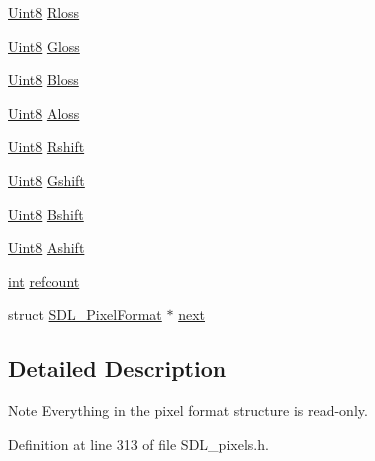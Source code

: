 \begin{DoxyCompactItemize}
\hyperlink{_s_d_l__stdinc_8h_a2944638813a090aa23e62f4da842c3e2}{Uint8} \hyperlink{struct_s_d_l___pixel_format_a9994b4ed87a2551253aebfa191db8424}{Rloss}
\item 
\hyperlink{_s_d_l__stdinc_8h_a2944638813a090aa23e62f4da842c3e2}{Uint8} \hyperlink{struct_s_d_l___pixel_format_a94469768d8436e631a13d68623ff663f}{Gloss}
\item 
\hyperlink{_s_d_l__stdinc_8h_a2944638813a090aa23e62f4da842c3e2}{Uint8} \hyperlink{struct_s_d_l___pixel_format_a337072c1bc8b41efdd2da4e95b8c2ff7}{Bloss}
\item 
\hyperlink{_s_d_l__stdinc_8h_a2944638813a090aa23e62f4da842c3e2}{Uint8} \hyperlink{struct_s_d_l___pixel_format_a660e95097874088292f1289a458efaa2}{Aloss}
\item 
\hyperlink{_s_d_l__stdinc_8h_a2944638813a090aa23e62f4da842c3e2}{Uint8} \hyperlink{struct_s_d_l___pixel_format_abfdec7b9ee2ee39db630f4022e4e0daa}{Rshift}
\item 
\hyperlink{_s_d_l__stdinc_8h_a2944638813a090aa23e62f4da842c3e2}{Uint8} \hyperlink{struct_s_d_l___pixel_format_a6045012f994c02a86bdc4a91b28d2a3c}{Gshift}
\item 
\hyperlink{_s_d_l__stdinc_8h_a2944638813a090aa23e62f4da842c3e2}{Uint8} \hyperlink{struct_s_d_l___pixel_format_a4212574b67529628d8822ed4eb109754}{Bshift}
\item 
\hyperlink{_s_d_l__stdinc_8h_a2944638813a090aa23e62f4da842c3e2}{Uint8} \hyperlink{struct_s_d_l___pixel_format_ac3c4ffa0de1f2c94040340deede3bf46}{Ashift}
\item 
\hyperlink{_s_d_l__thread_8h_a6a64f9be4433e4de6e2f2f548cf3c08e}{int} \hyperlink{struct_s_d_l___pixel_format_a23be8060443d58064a720a4e2ef31729}{refcount}
\item 
struct \hyperlink{struct_s_d_l___pixel_format}{S\-D\-L\-\_\-\-Pixel\-Format} $\ast$ \hyperlink{struct_s_d_l___pixel_format_a1953b66c817116bf81bae4873ee6bce5}{next}
\end{DoxyCompactItemize}


\subsection{Detailed Description}
\begin{DoxyNote}{Note}
Everything in the pixel format structure is read-\/only. 
\end{DoxyNote}


Definition at line 313 of file S\-D\-L\-\_\-pixels.\-h.



